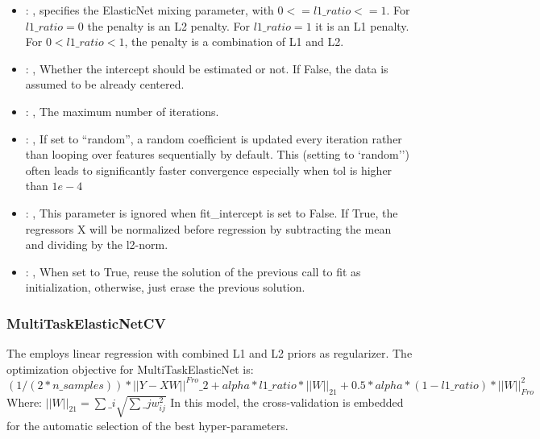 \begin{itemize}
    \item {}: , 
      specifies the                                                  ElasticNet mixing parameter,
      with $0 <= l1\_ratio <= 1$.                                                  For $l1\_ratio =
      0$ the penalty is an L2 penalty.                                                  For
      $l1\_ratio = 1$ it is an L1 penalty.                                                  For $0 <
      l1\_ratio < 1$, the penalty is a combination of L1 and L2.

    \item {}: , 
      Whether the intercept should be estimated or not. If False,
      the data is assumed to be already centered.

    \item {}: , 
      The maximum number of iterations.

    \item {}: , 
      If set to ``random'', a random coefficient is updated every iteration
      rather than looping over features sequentially by default. This (setting to `random'')
      often leads to significantly faster convergence especially when tol is higher than $1e-4$

    \item {}: , 
      This parameter is ignored when fit\_intercept is set to False. If True,
      the regressors X will be normalized before regression by subtracting the mean and
      dividing by the l2-norm.

    \item {}: , 
      When set to True, reuse the solution of the previous call
      to fit as initialization, otherwise, just erase the previous solution.
  \end{itemize}


\subsubsection{MultiTaskElasticNetCV}
  The  employs                         linear regression with
  combined L1 and L2 priors as regularizer.                         The optimization objective for
  MultiTaskElasticNet is:                         $(1 / (2 * n\_samples)) * ||Y - XW||^{Fro}\_2
  + alpha * l1\_ratio * ||W||_{21}                         + 0.5 * alpha * (1 - l1\_ratio) *
  ||W||_{Fro}^2$                         \\Where:                         $||W||_{21} = \sum\_i
  \sqrt{\sum\_j w_{ij}^2}$                         In this model, the cross-validation is embedded
  for the automatic selection                         of the best hyper-parameters.

